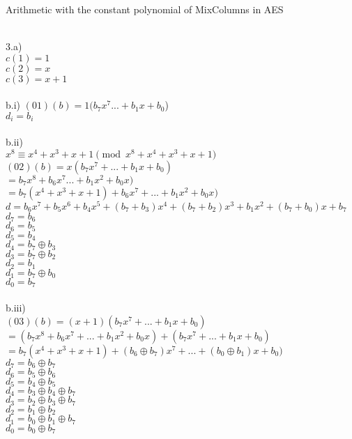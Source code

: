 \documentclass{assignment}
\begin{document}
\begin{problemlist}
\pbitem Arithmetic with the constant polynomial of MixColumns in AES
\begin{problem}
\begin{answer}
\\
3.a)\\
$c(1)=1$\\
$c(2)=x$\\
$c(3)=x+1$\\
\\
b.i)   
$(01)(b)=1(b_7x^7...+b_1x+b_0$)\\
$d_i=b_i$\\
\\
b.ii)\\
$x^8\equiv x^4+x^3+x+1 \pmod {x^8+x^4+x^3+x+1}$\\
$(02)(b)=x(b_7x^7+...+b_1x+b_0)$\\
$=b_7x^8+b_6x^7...+b_1x^2+b_0x)$\\
$=b_7(x^4+x^3+x+1)+b_6x^7+...+b_1x^2+b_0x)$\\
$d=b_6x^7+b_5x^6+b_4x^5+(b_7+b_3)x^4+(b_7+b_2)x^3+b_1x^2+(b_7+b_0)x+b_7$\\
$d_7=b_6$\\
$d_6=b_5$\\
$d_5=b_4$\\
$d_4=b_7\oplus b_3$\\
$d_3=b_7\oplus b_2$\\
$d_2=b_1$\\
$d_1=b_7\oplus b_0$\\
$d_0=b_7$\\
\\
b.iii)\\
$(03)(b)=(x+1)(b_7x^7+...+b_1x+b_0)$\\
$=(b_7x^8+b_6x^7+...+b_1x^2+b_0x)+(b_7x^7+...+b_1x+b_0)$\\
$=b_7(x^4+x^3+x+1)+(b_6\oplus b_7)x^7+...+(b_0\oplus b_1)x+b_0)$\\
$d_7=b_6\oplus b_7$\\
$d_6=b_5\oplus b_6$\\
$d_5=b_4\oplus b_5$\\
$d_4=b_3\oplus b_4 \oplus b_7$\\
$d_3=b_2\oplus b_3 \oplus b_7$\\
$d_2=b_1\oplus b_2$\\
$d_1=b_0\oplus b_1 \oplus b_7$\\
$d_0=b_0 \oplus b_7$\\


\end{answer}
\end{problem}
\end{problemlist}
\end{document}
